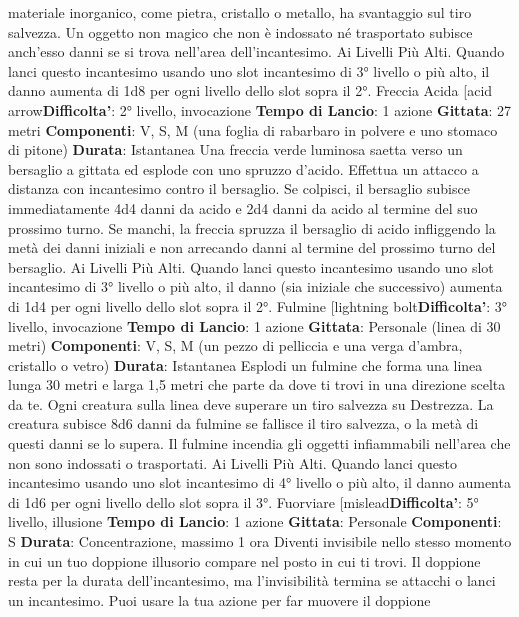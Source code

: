 \begin{multicols}{2}
materiale inorganico, come pietra, cristallo o metallo, ha
svantaggio sul tiro salvezza.
Un oggetto non magico che non è indossato né
trasportato subisce anch’esso danni se si trova
nell’area dell’incantesimo.
Ai Livelli Più Alti. Quando lanci questo incantesimo
usando uno slot incantesimo di 3° livello o più alto, il
danno aumenta di 1d8 per ogni livello dello slot sopra il
2°.
Freccia Acida
[acid arrow\textbf{Difficolta'}:
2° livello, invocazione
\textbf{Tempo di Lancio}: 1 azione
\textbf{Gittata}: 27 metri
\textbf{Componenti}: V, S, M (una foglia di rabarbaro in
polvere e uno stomaco di pitone)
\textbf{Durata}: Istantanea
Una freccia verde luminosa saetta verso un bersaglio a
gittata ed esplode con uno spruzzo d’acido. Effettua un
attacco a distanza con incantesimo contro il bersaglio.
Se colpisci, il bersaglio subisce immediatamente 4d4
danni da acido e 2d4 danni da acido al termine del suo
prossimo turno. Se manchi, la freccia spruzza il
bersaglio di acido infliggendo la metà dei danni iniziali e
non arrecando danni al termine del prossimo turno del
bersaglio.
Ai Livelli Più Alti. Quando lanci questo incantesimo
usando uno slot incantesimo di 3° livello o più alto, il
danno (sia iniziale che successivo) aumenta di 1d4 per
ogni livello dello slot sopra il 2°.
Fulmine
[lightning bolt\textbf{Difficolta'}:
3° livello, invocazione
\textbf{Tempo di Lancio}: 1 azione
\textbf{Gittata}: Personale (linea di 30 metri)
\textbf{Componenti}: V, S, M (un pezzo di pelliccia e una
verga d’ambra, cristallo o vetro)
\textbf{Durata}: Istantanea
Esplodi un fulmine che forma una linea lunga 30 metri e
larga 1,5 metri che parte da dove ti trovi in una
direzione scelta da te.
Ogni creatura sulla linea deve superare un tiro salvezza
su Destrezza. La creatura subisce 8d6 danni da fulmine
se fallisce il tiro salvezza, o la metà di questi danni se lo
supera.
Il fulmine incendia gli oggetti infiammabili nell’area che
non sono indossati o trasportati.
Ai Livelli Più Alti. Quando lanci questo incantesimo
usando uno slot incantesimo di 4° livello o più alto, il
danno aumenta di 1d6 per ogni livello dello slot sopra il
3°.
Fuorviare
[mislead\textbf{Difficolta'}:
5° livello, illusione
\textbf{Tempo di Lancio}: 1 azione
\textbf{Gittata}: Personale
\textbf{Componenti}: S
\textbf{Durata}: Concentrazione, massimo 1 ora
Diventi invisibile nello stesso momento in cui un tuo
doppione illusorio compare nel posto in cui ti trovi. Il
doppione resta per la durata dell’incantesimo, ma
l’invisibilità termina se attacchi o lanci un incantesimo.
Puoi usare la tua azione per far muovere il doppione

\end{multicols}
